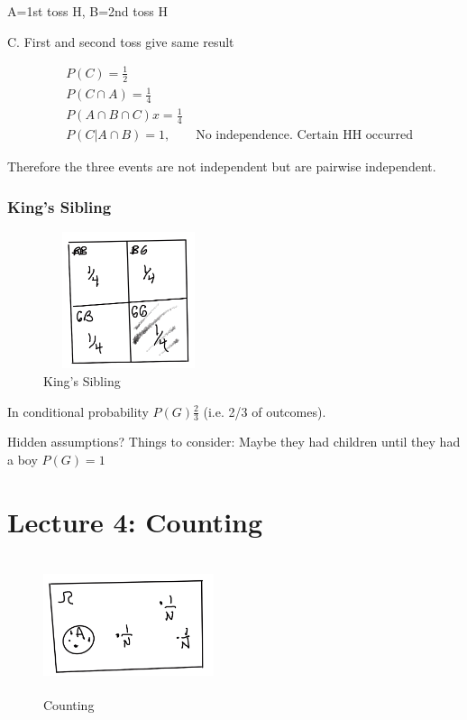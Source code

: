 \documentclass{article}
\begin{document}
A={1st toss H}, B={2nd toss H}

C. First and second toss give same result

\begin{align*}
&P(C)=\frac{1}{2}\\
&P(C \cap A) = \frac{1}{4}\\
&P(A \cap B \cap C)x = \frac{1}{4}\\
&P(C|A \cap B) = 1, \qquad \text{No independence. Certain HH occurred}
\end{align*}

Therefore the three events are not independent but are pairwise independent.

\subsubsection{King's Sibling}


\begin{figure}[ht]
\centering
\includegraphics[width=5cm, height=4cm]{images/L03/kings_sibling.jpeg}
\caption{King's Sibling}
\end{figure}

In conditional probability $P(G)\frac{2}{3}$ (i.e. 2/3 of outcomes).

Hidden assumptions?  Things to consider: Maybe they had children until they had a boy $P(G)=1$

\section{Lecture 4: Counting}


\begin{figure}[ht]
\centering
\includegraphics[width=5cm, height=4cm]{images/L04/counting.jpeg}
\caption{Counting}
\end{figure}
\end{document}
